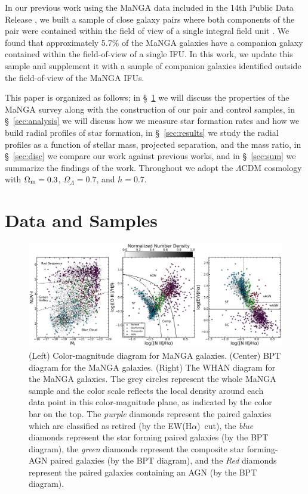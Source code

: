 \documentclass[apj,twocolumn]{emulateapj}
\newcommand{\ewha}{EW(H$\alpha$)}
\begin{document}
\begin{CJK*}{UTF8}{gbsn}
In our previous work using the MaNGA data included in the 14th Public Data Release \citep[DR14;][]{Abolfathi:2018}, we built a sample of close galaxy pairs where both components of the pair were contained within the field of view of a single integral field unit \citep[][hereafter ]{Fu:2018}. We found that approximately 5.7\% of the MaNGA galaxies have a companion galaxy contained within the field-of-view of a single IFU. In this work, we update this sample and supplement it with a sample of companion galaxies identified outside the field-of-view of the MaNGA IFUs. 

This paper is organized as follows; in \S~\ref{sec:data} we will discuss the properties of the MaNGA survey along with the construction of our pair and control samples, in \S~\ref{sec:analysis} we will discuss how we measure star formation rates and how we build radial profiles of star formation, in \S~\ref{sec:results} we study the radial profiles as a function of stellar mass, projected separation, and the mass ratio, in \S~\ref{sec:disc} we compare our work against previous works, and in \S~\ref{sec:sum} we summarize the findings of the work. 
Throughout we adopt the $\Lambda$CDM cosmology with $\Omega_{\rm m}=0.3$, $\Omega_\Lambda=0.7$, and $h=0.7$. 

\section{Data and Samples}\label{sec:data}

\begin{figure}
\centering
\includegraphics[width=\linewidth]{bpt-cmd.pdf}
\caption[]{(Left) Color-magnitude diagram for MaNGA galaxies. (Center) BPT diagram for the MaNGA galaxies. (Right) The WHAN diagram for the MaNGA galaxies. The grey circles represent the whole MaNGA sample and the color scale reflects the local density around each data point in this color-magnitude plane, as indicated by the color bar on the top. The {\it purple} diamonds represent the paired galaxies which are classified as retired (by the \ewha\ cut), the {\it blue} diamonds represent the star forming paired galaxies (by the BPT diagram), the {\it green} diamonds represent the composite star forming-AGN paired galaxies (by the BPT diagram), and the {\it Red} diamonds represent the paired galaxies containing an AGN (by the BPT diagram).}
\label{fig:cmd}
\end{figure}


\end{CJK*}
\end{document}
